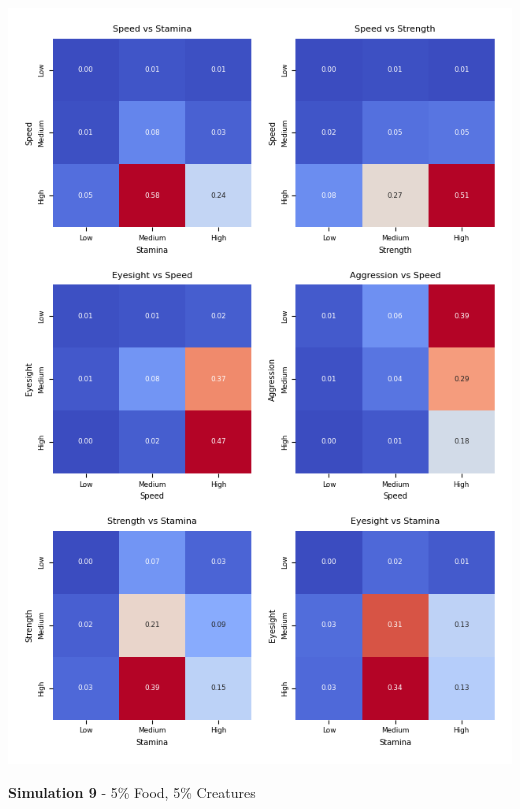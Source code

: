 \documentclass{article}
\begin{document}
\begin{center}
    \includegraphics[scale=0.9]{tests/2.8_confusion_matrices.png}
\end{center}
\textbf{Simulation 9} - 5\% Food, 5\% Creatures
\end{document}
